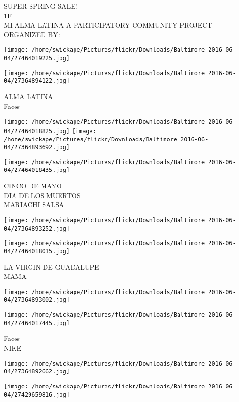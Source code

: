 \documentclass[10pt,letterpaper]{article}
\begin{document}
SUPER SPRING SALE!\\
1F\\
MI ALMA LATINA A PARTICIPATORY COMMUNITY PROJECT ORGANIZED BY:
\pagebreak

\texttt{[image: /home/swickape/Pictures/flickr/Downloads/Baltimore 2016-06-04/27464019225.jpg]}

\vspace{0.25in}
\texttt{[image: /home/swickape/Pictures/flickr/Downloads/Baltimore 2016-06-04/27364894122.jpg]}

ALMA LATINA\\
Faces
\pagebreak

\texttt{[image: /home/swickape/Pictures/flickr/Downloads/Baltimore 2016-06-04/27464018825.jpg]}
\texttt{[image: /home/swickape/Pictures/flickr/Downloads/Baltimore 2016-06-04/27364893692.jpg]}

\vspace{0.25in}
\texttt{[image: /home/swickape/Pictures/flickr/Downloads/Baltimore 2016-06-04/27464018435.jpg]}

CINCO DE MAYO\\
DIA DE LOS MUERTOS\\
MARIACHI SALSA
\pagebreak

\texttt{[image: /home/swickape/Pictures/flickr/Downloads/Baltimore 2016-06-04/27364893252.jpg]}

\vspace{0.25in}
\texttt{[image: /home/swickape/Pictures/flickr/Downloads/Baltimore 2016-06-04/27464018015.jpg]}

LA VIRGIN DE GUADALUPE\\
MAMA
\pagebreak

\texttt{[image: /home/swickape/Pictures/flickr/Downloads/Baltimore 2016-06-04/27364893002.jpg]}

\vspace{0.25in}
\texttt{[image: /home/swickape/Pictures/flickr/Downloads/Baltimore 2016-06-04/27464017445.jpg]}

Faces\\
NIKE
\pagebreak

\texttt{[image: /home/swickape/Pictures/flickr/Downloads/Baltimore 2016-06-04/27364892662.jpg]}

\vspace{0.25in}
\texttt{[image: /home/swickape/Pictures/flickr/Downloads/Baltimore 2016-06-04/27429659816.jpg]}
\end{document}
